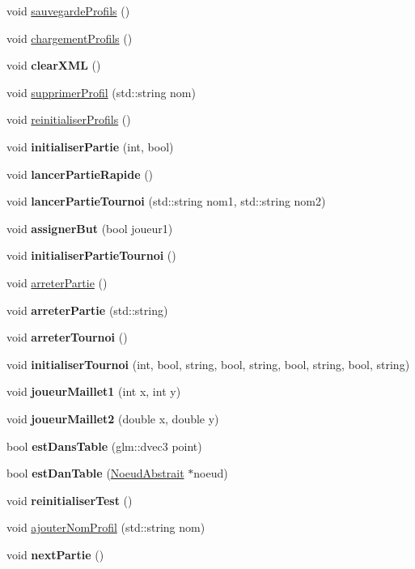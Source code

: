 \begin{DoxyCompactItemize}
void \hyperlink{group__inf2990_ga5790b64f21bda18cb0bfbb7fd9d3f178}{sauvegarde\+Profils} ()
\item 
void \hyperlink{group__inf2990_gaf4d9550852335d55a5196893444d159f}{chargement\+Profils} ()
\item 
void {\bfseries clear\+X\+ML} ()
\item 
void \hyperlink{group__inf2990_ga1feb4072d211b61f86f1ed2d499ca3c3}{supprimer\+Profil} (std\+::string nom)
\item 
void \hyperlink{group__inf2990_gad015b5798cb7e60834c44233d147d166}{reinitialiser\+Profils} ()
\item 
void {\bfseries initialiser\+Partie} (int, bool)
\item 
void {\bfseries lancer\+Partie\+Rapide} ()
\item 
void {\bfseries lancer\+Partie\+Tournoi} (std\+::string nom1, std\+::string nom2)
\item 
void {\bfseries assigner\+But} (bool joueur1)
\item 
void {\bfseries initialiser\+Partie\+Tournoi} ()
\item 
void \hyperlink{group__inf2990_ga4a9b8ae1fda44aaff19b1c31c87cd35e}{arreter\+Partie} ()
\item 
void {\bfseries arreter\+Partie} (std\+::string)
\item 
void {\bfseries arreter\+Tournoi} ()
\item 
void {\bfseries initialiser\+Tournoi} (int, bool, string, bool, string, bool, string, bool, string)
\item 
void {\bfseries joueur\+Maillet1} (int x, int y)
\item 
void {\bfseries joueur\+Maillet2} (double x, double y)
\item 
\hypertarget{class_facade_modele_ab84cc5f6238eefd8c51f4febecffb09f}{}\label{class_facade_modele_ab84cc5f6238eefd8c51f4febecffb09f} 
bool {\bfseries est\+Dans\+Table} (glm\+::dvec3 point)
\item 
\hypertarget{class_facade_modele_ae7433a430200451b6353d3cb96e3cb7f}{}\label{class_facade_modele_ae7433a430200451b6353d3cb96e3cb7f} 
bool {\bfseries est\+Dan\+Table} (\hyperlink{class_noeud_abstrait}{Noeud\+Abstrait} $\ast$noeud)
\item 
void {\bfseries reinitialiser\+Test} ()
\item 
void \hyperlink{group__inf2990_gaa15ce9a1038a9b4674882ceb9ad9c195}{ajouter\+Nom\+Profil} (std\+::string nom)
\item 
void {\bfseries next\+Partie} ()
\item 

\end{DoxyCompactItemize}
